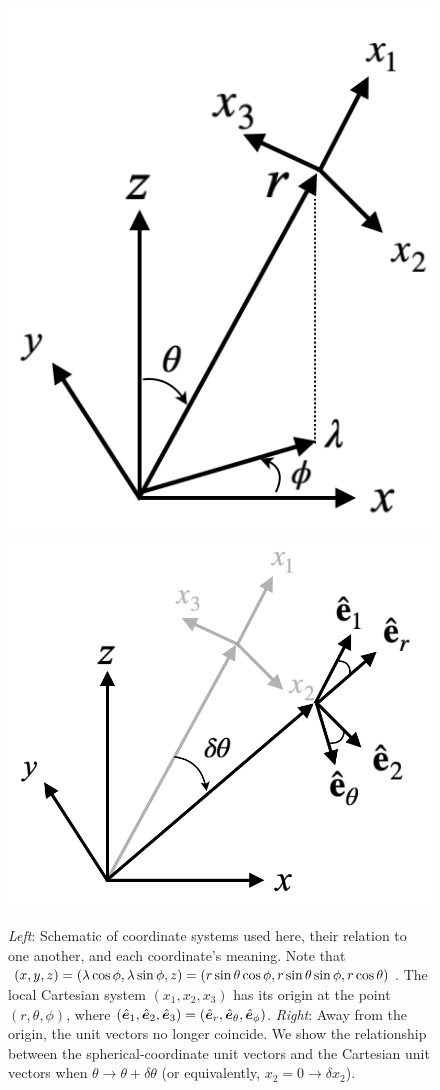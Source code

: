 \documentclass[12pt]{article}
\begin{document}
  \begin{figure}
	\includegraphics[scale=0.4]{Fig1_coordinate_systems.png}\hfill 	\includegraphics[scale=0.35]{Fig2_Pertx2.png}
	\caption{\textit{Left}: Schematic of coordinate systems used here, their relation to one another, and each coordinate's meaning. Note that $(x,y,z) = (\lambda\cos\phi, \lambda\sin\phi, z) = (r\sin\theta\cos\phi, r\sin\theta\sin\phi, r\cos\theta)$. The local Cartesian system $(x_1,x_2,x_3)$ has its origin at the point $(r,\theta,\phi)$, where $(\hat{\bm{e}}_1,\hat{\bm{e}}_2,\hat{\bm{e}}_3) = (\hat{\bm{e}}_r, \hat{\bm{e}}_\theta, \hat{\bm{e}}_\phi)$. \textit{Right}: Away from the origin, the unit vectors no longer coincide. We show the relationship between the spherical-coordinate unit vectors and the Cartesian unit vectors when $\theta\rightarrow\theta+\delta\theta$ (or equivalently, $x_2=0\rightarrow  \delta x_2$). }
	\label{fig:coords}
\end{figure}
\end{document}
